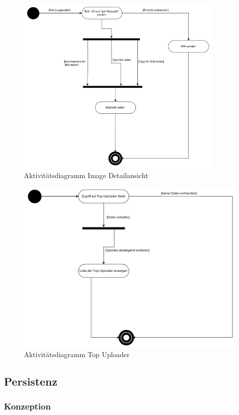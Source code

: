 \documentclass[12pt, oneside, a4paper]{article}		%
\begin{document}
\begin{figure}[H]
	\centering
	\includegraphics[width=10cm]{footage/ZIMG_ActivityDiagram_ImageDetailview} 
	\caption{Aktivitätsdiagramm Image Detailansicht}
	\label{AcitivityDiagramImageDetailview}
\end{figure}

\begin{figure}[H]
	\centering
	\includegraphics[width=10cm10cm]{footage/ZIMG_ActivityDiagram_topUploader} 
	\caption{Aktivitätsdiagramm Top Uploader}
	\label{AcitivityDiagramTopUploader}
\end{figure}

\newpage

\subsection{Persistenz}

\subsubsection{Konzeption}
\end{document}

